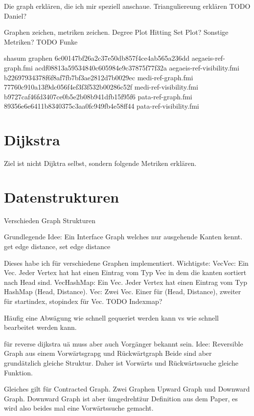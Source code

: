 Die graph erklären, die ich mir speziell anschaue.
Trianguliereung erklären TODO Daniel?

Graphen zeichen, metriken zeichen.
Degree Plot
Hitting Set Plot?
Sonstige Metriken? TODO Funke


shasum graphen
6c00147bf26a2c37e50db857f4ce4ab565a236dd  aegaeis-ref-graph.fmi
acdf08813a59534840c605984e9c37875f77f32a  aegaeis-ref-visibility.fmi
b22697934378f6f8af7fb7bf3ae2812d7b0029ec  medi-ref-graph.fmi
77760c910a13f9dc056f4ef3f3f532b00286c52f  medi-ref-visibility.fmi
b9727caf46fd3407ce0b5e2b08b941dfb15f95f6  pata-ref-graph.fmi
89356e6e6411b8340375c3aa0fc949fb4e58ff44  pata-ref-visibility.fmi


\section{Dijkstra}


Ziel ist nicht Dijktra selbst, sondern folgende Metriken erklären.


\section{Datenstrukturen}

Verschieden Graph Strukturen

Grundlegende Idee:
Ein Interface Graph welches nur ausgehende Kanten kennt.
get edge distance, set edge distance

Dieses habe ich für verschiedene Graphen implementiert.
Wichtigste:
VecVec: Ein Vec. Jeder Vertex hat hat einen Eintrag vom Typ Vec in dem die kanten sortiert nach Head sind.
VecHashMap: Ein Vec. Jeder Vertex hat einen Eintrag vom Typ HashMap (Head, Distance).
Vec: Zwei Vec. Einer für (Head, Distance), zweiter für startindex, stopindex für Vec.
TODO Indexmap?

Häufig eine Abwägung wie schnell gequeriet werden kann vs wie schnell bearbeitet werden kann.


für reverse dijkstra uä muss aber auch Vorgänger bekannt sein.
Idee: Reversible Graph aus einem Vorwärtsgrapg und Rückwärtgraph
Beide sind aber grundätzlich gleiche Struktur. Daher ist Vorwärts und Rückwärtssuche gleiche Funktion.


Gleiches gilt für Contracted Graph. Zwei Graphen Upward Graph und Downward Graph. Downward Graph ist aber \"umgedreht\" zur Definition aus dem Paper, es wird also beides mal eine Vorwärtssuche gemacht.


